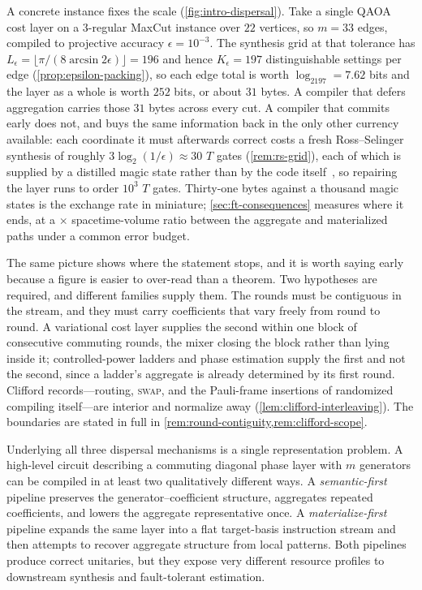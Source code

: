 \documentclass[aps,prx,reprint,floatfix,superscriptaddress]{revtex4-2}
\begin{document}
A concrete instance fixes the scale (\cref{fig:intro-dispersal}).  Take
a single QAOA~\cite{farhi2014qaoa} cost layer on a $3$-regular MaxCut instance over $22$
vertices, so $m=33$ edges, compiled to projective accuracy
$\epsilon=10^{-3}$.  The synthesis grid at that tolerance has
$L_\epsilon=\lfloor\pi/(8\arcsin2\epsilon)\rfloor=196$ and hence
$K_\epsilon=197$ distinguishable settings per edge
(\cref{prop:epsilon-packing}), so each edge total is worth
$\log_2197=7.62$ bits and the layer as a whole is worth $252$ bits, or
about $31$ bytes.  A compiler that defers aggregation carries those
$31$ bytes across every cut.  A compiler that commits early does not,
and buys the same information back in the only other currency
available: each coordinate it must afterwards correct costs a fresh
Ross--Selinger synthesis of roughly $3\log_2(1/\epsilon)\approx30$ $T$
gates (\cref{rem:rs-grid}), each of which is supplied by a distilled
magic state rather than by the code
itself~\cite{bravyi2005magic,litinski2019magic}, so repairing the layer
runs to order
$10^{3}$ $T$ gates.  Thirty-one bytes against a thousand magic states
is the exchange rate in miniature; \cref{sec:ft-consequences} measures
where it ends, at a \QREMaterializeSpacetimeRatio$\times$
spacetime-volume ratio between the aggregate and materialized paths
under a common error budget.

The same picture shows where the statement stops, and it is worth
saying early because a figure is easier to over-read than a theorem.
Two hypotheses are required, and different families supply them.  The
rounds must be contiguous in the stream, and they must carry
coefficients that vary freely from round to round.  A variational cost
layer supplies the second within one block of consecutive commuting
rounds, the mixer closing the block rather than lying inside it;
controlled-power ladders and phase estimation supply the first and not
the second, since a ladder's aggregate is already determined by its
first round.  Clifford records---routing, \textsc{swap}, and the
Pauli-frame insertions of randomized compiling itself---are interior
and normalize away (\cref{lem:clifford-interleaving}).  The boundaries
are stated in full in \cref{rem:round-contiguity,rem:clifford-scope}.

Underlying all three dispersal mechanisms is a single representation
problem. A high-level circuit describing
a commuting diagonal phase layer with $m$ generators can be compiled in at
least two qualitatively different ways. A \emph{semantic-first} pipeline
preserves the generator--coefficient structure, aggregates repeated
coefficients, and lowers the aggregate representative once. A
\emph{materialize-first} pipeline expands the same layer into a flat
target-basis instruction stream and then attempts to recover aggregate
structure from local patterns. Both pipelines produce correct unitaries,
but they expose very different resource profiles to downstream synthesis
and fault-tolerant estimation.
\end{document}
